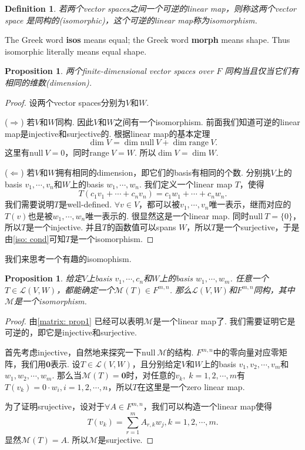 \documentclass{article}
\newtheorem{proposition}[theorem]{Proposition}
\newtheorem{definition}[theorem]{Definition}
\newcommand\nul[1]{\text{null}\ #1}
\newcommand\range[1]{\text{range}\ #1}
\begin{document}
\begin{definition}
\rm 若两个vector spaces之间一个可逆的linear map，则称这两个vector space 是同构的(isomorphic)，这个可逆的linear map称为{\color{red}isomorphism}.
\end{definition}

{\color{blue} The Greek word \textbf{isos} means equal; the Greek word \textbf{morph} means shape. Thus isomorphic literally means equal shape}.

\begin{proposition}\label{matrix: iso-same-dim}
\rm 两个finite-dimensional vector spaces over $F$ 同构当且仅当它们有相同的维数(dimension).
\end{proposition}

\begin{proof}
设两个vector spaces分别为$V$和$W$.

($\Rightarrow$) 若$V$和$W$同构. 因此$V$和$W$之间有一个isomorphism. 前面我们知道可逆的linear map是injective和surjective的. 根据linear map的基本定理
$$
	\dim V = \dim\nul{V} + \dim\range{V}.
$$
这里有$\nul{V} =  0$，同时$\range{V} =  W$. 所以$\dim V  = \dim W$.

($\Leftarrow$) 若$V$和$W$拥有相同的dimension，即它们的basis有相同的个数. 分别挑$V$上的basis $v_1,\cdots,v_n$和$W$上的basis $w_1,\cdots,w_n$. 我们定义一个linear map $T$，使得
$$
	T(c_1v_1 + \cdots + c_nv_n) =  c_1w_1 + \cdots + c_nw_n.
$$
我们需要说明$T$是well-defined. $\forall v \in V$，都可以被$v_1,\cdots,v_n$唯一表示，继而对应的$T(v)$也是被$w_1,\cdots,w_n$唯一表示的. 很显然这是一个linear map. 同时$\nul{T} = \{0\}$，所以$T$是一个injective. 并且$T$的函数值可以spans $W$，所以$T$是一个surjective，于是由\ref{iso: cond}可知$T$是一个isomorphism.
\end{proof}

{\color{red} 我们来思考一个有趣的isomophism}.

\begin{proposition} \label{matrix: iso-with-linear-maps-set}
\rm 给定$V$上basis $v_1,\cdots,c_n$和$W$上的basis $w_1,\cdots,w_m$. 任意一个$T \in \mathcal{L}(V,W)$，都能确定一个$\mathcal{M}(T) \in F^{m,n}$. 那么$\mathcal{L}(V,W)$和$F^{m,n}$同构，其中$\mathcal{M}$是一个isomorphism.
\end{proposition}

\begin{proof}
由\ref{matrix: prop1} 已经可以表明$\mathcal{M}$是一个linear map了. 我们需要证明它是可逆的，即它是injective和surjective.

首先考虑injective，自然地来探究一下$\nul{\mathcal{M}}$的结构. $F^{m,n}$中的零向量对应零矩阵，我们用$\mathbf{0}$表示. 设$T \in \mathcal{L}(V,W)$，且分别给定$V$和$W$上的basis $v_1,v_2,\cdots,v_m$和$w_1,w_2,\cdots,w_m$. 那么当$\mathcal{M}(T) = \mathbf{0}$时，对任意的$v_k, \; k=1,2,\cdots,m$有$T(v_k) = 0 \cdot  w_i, i=1,2,\cdots,n$，所以$T$在这里是一个zero linear map. 

为了证明srujective，设对于$\forall A \in F^{m,n}$，我们可以构造一个linear map使得
$$
	T(v_k) = \sum\limits_{r=1}^{m}A_{r,k}w_j, k= 1,2,\cdots,m.
$$
显然$\mathcal{M}(T)=A$. 所以$\mathcal{M}$是surjective.
\end{proof}
\end{document}
